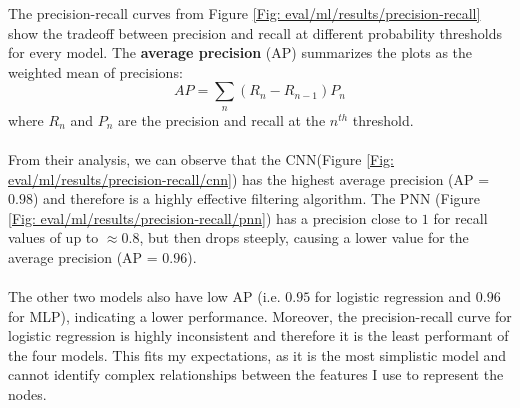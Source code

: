 		The precision-recall curves from Figure \ref{Fig: eval/ml/results/precision-recall} show the tradeoff between precision and recall at different probability thresholds for every model. The \textbf{average precision} (AP) summarizes the plots as the weighted mean of precisions:
		\begin{equation}
			AP = \sum_{n} (R_n - R_{n-1}) P_n
		\end{equation}
		where $R_n$ and $P_n$ are the precision and recall at the $n^{th}$ threshold. 
		\\ \\
		From their analysis, we can observe that the CNN(Figure \ref{Fig: eval/ml/results/precision-recall/cnn}) has the highest average precision (AP = $0.98$) and therefore is a highly effective filtering algorithm. The PNN (Figure \ref{Fig: eval/ml/results/precision-recall/pnn}) has a precision close to $1$ for recall values of up to $\approx 0.8$, but then drops steeply, causing a lower value for the average precision (AP = $0.96$). 
		\\ \\
		The other two models also have low AP (i.e. $0.95$ for logistic regression and $0.96$ for MLP), indicating a lower performance. Moreover, the precision-recall curve for logistic regression is highly inconsistent and therefore it is the least performant of the four models. This fits my expectations, as it is the most simplistic model and cannot identify complex relationships between the features I use to represent the nodes.
